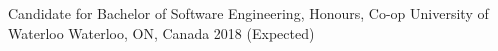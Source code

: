 \begin{cventries}
  \cventry
    {Candidate for Bachelor of Software Engineering, Honours, Co-op}
    {University of Waterloo}
    {Waterloo, ON, Canada}
    {2018 (Expected)}
    {}
\end{cventries}
